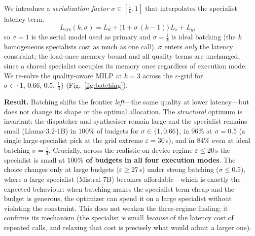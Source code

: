 \documentclass[11pt]{article}
\newcommand{\eps}{\varepsilon}
\begin{document}
We introduce a \emph{serialization factor} $\sigma\in[\tfrac{1}{k},1]$ that
interpolates the specialist latency term,
\begin{equation}
L_{\mathrm{sys}}(k,\sigma)=L_d+\big(1+\sigma\,(k-1)\big)\,L_s+L_y,
\label{eq:sigma}
\end{equation}
so $\sigma{=}1$ is the serial model used as primary and $\sigma{=}\tfrac{1}{k}$
is ideal batching (the $k$ homogeneous specialists cost as much as one call).
$\sigma$ enters \emph{only} the latency constraint; the load-once memory bound and
all quality terms are unchanged, since a shared specialist occupies its memory once
regardless of execution mode. We re-solve the quality-aware MILP at $k{=}3$ across
the $\eps$-grid for $\sigma\in\{1,\,0.66,\,0.5,\,\tfrac{1}{3}\}$
(Fig.~\ref{fig:batching}).

\textbf{Result.} Batching shifts the frontier \emph{left}---the same quality at
lower latency---but does not change its shape or the optimal allocation. The
\emph{structural} optimum is invariant: the dispatcher and synthesiser remain large
and the specialist remains small (Llama-3.2-1B) in $100\%$ of budgets for
$\sigma\in\{1,0.66\}$, in $96\%$ at $\sigma{=}0.5$ (a single large-specialist
pick at the grid extreme $\eps{=}30$\,s), and in $84\%$ even at ideal batching
$\sigma{=}\tfrac{1}{3}$.
Crucially, across the realistic on-device regime $\eps\le20$\,s the specialist is
small at \textbf{$100\%$ of budgets in all four execution modes}. The choice
changes only at large budgets ($\eps\ge27$\,s) under strong batching
($\sigma\le0.5$), where a large specialist (Mistral-7B) becomes affordable---which is exactly the
expected behaviour: when batching makes the specialist term cheap and the budget is
generous, the optimizer can spend it on a large specialist without violating the
constraint. This does not weaken the three-regime finding; it confirms its
mechanism (the specialist is small \emph{because} of the latency cost of repeated
calls, and relaxing that cost is precisely what would admit a larger one).
\end{document}

